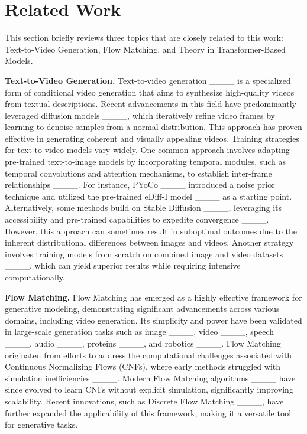 \section{Related Work}
This section briefly reviews three topics that are closely related to this work: Text-to-Video Generation, Flow Matching, and Theory in Transformer-Based Models. 

{\bf Text-to-Video Generation.}
Text-to-video generation ____ is a specialized form of conditional video generation that aims to synthesize high-quality videos from textual descriptions. Recent advancements in this field have predominantly leveraged diffusion models ____, which iteratively refine video frames by learning to denoise samples from a normal distribution. This approach has proven effective in generating coherent and visually appealing videos.
Training strategies for text-to-video models vary widely. One common approach involves adapting pre-trained text-to-image models by incorporating temporal modules, such as temporal convolutions and attention mechanisms, to establish inter-frame relationships ____. For instance, PYoCo ____ introduced a noise prior technique and utilized the pre-trained eDiff-I model ____ as a starting point. Alternatively, some methods build on Stable Diffusion ____, leveraging its accessibility and pre-trained capabilities to expedite convergence ____. However, this approach can sometimes result in suboptimal outcomes due to the inherent distributional differences between images and videos. Another strategy involves training models from scratch on combined image and video datasets ____, which can yield superior results while requiring intensive computationally.
\ifdefined\isarxiv
\else
\vspace{-2mm}
\fi

{\bf Flow Matching.}
Flow Matching has emerged as a highly effective framework for generative modeling, demonstrating significant advancements across various domains, including video generation. Its simplicity and power have been validated in large-scale generation tasks such as image ____, video ____, speech ____,  audio ____, proteins ____, and robotics ____. Flow Matching originated from efforts to address the computational challenges associated with Continuous Normalizing Flows (CNFs), where early methods struggled with simulation inefficiencies ____. Modern Flow Matching algorithms ____ have since evolved to learn CNFs without explicit simulation, significantly improving scalability. Recent innovations, such as Discrete Flow Matching ____, have further expanded the applicability of this framework, making it a versatile tool for generative tasks.

